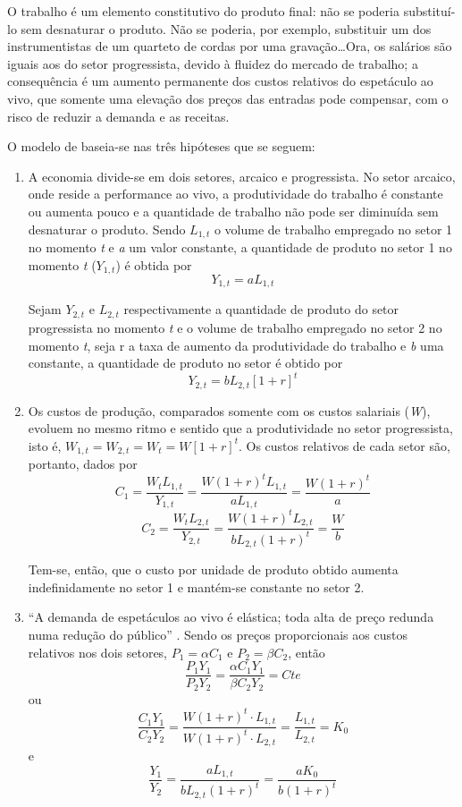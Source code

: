 \documentclass[a4paper, 12pt, openright, oneside, german, french, english, brazil, article]{abntex2}
\begin{document}
\begin{citacao}
	O trabalho é um elemento constitutivo do produto final: não se poderia substituí-lo sem desnaturar o produto. Não se poderia, por exemplo, substituir um dos instrumentistas de um quarteto de cordas por uma gravação\ldots Ora, os salários são iguais aos do setor progressista, devido à fluidez do mercado de trabalho; a consequência é um aumento permanente dos custos relativos do espetáculo ao vivo, que somente uma elevação dos preços das entradas pode compensar, com o risco de reduzir a demanda e as receitas. 
\end{citacao}

O modelo de  baseia-se nas três hipóteses que se seguem:

\begin{enumerate}
	\item A economia divide-se em dois setores, arcaico e progressista. No setor arcaico, onde reside a performance ao vivo, a produtividade do trabalho é constante ou aumenta pouco e a quantidade de trabalho não pode ser diminuída sem desnaturar o produto. Sendo $L_{1,t}$ o volume de trabalho empregado no setor 1 no momento \textit{t} e \textit{a} um valor constante, a quantidade de produto no setor 1 no momento \textit{t} ($Y_{1,t}$) é obtida por $$Y_{1,t} = aL_{1,t}$$
	
	Sejam $Y_{2,t}$ e $L_{2,t}$ respectivamente a quantidade de produto do setor progressista no momento \textit{t} e o volume de trabalho empregado no setor 2 no momento \textit{t}, seja r a taxa de aumento da produtividade do trabalho e \textit{b} uma constante, a quantidade de produto no setor é obtido por $$Y_{2,t} = bL_{2,t}[1+r]^t $$
	
	\item Os custos de produção, comparados somente com os custos salariais (\textit{W}), evoluem no mesmo ritmo e sentido que a produtividade no setor progressista, isto é, $W_{1,t} = W_{2,t} = W_t = W[1+r]^t$. Os custos relativos de cada setor são, portanto, dados por
	$$C_1 = \frac{W_tL_{1,t}}{Y_{1,t}} = \frac{W(1+r)^tL_{1,t}}{aL_{1,t}} = \frac{W(1+r)^t}{a}$$
	$$C_2 = \frac{W_tL_{2,t}}{Y_{2,t}} = \frac{W(1+r)^tL_{2,t}}{bL_{2,t}(1+r)^t} = \frac{W}{b}$$
	
	Tem-se, então, que o custo por unidade de produto obtido aumenta indefinidamente no setor 1 e mantém-se constante no setor 2.
	
	\item ``A demanda de espetáculos ao vivo é elástica; toda alta de preço redunda numa redução do público'' \cite[p. 56]{benhamou2007economia}. Sendo os preços proporcionais aos custos relativos nos dois setores, $P_1 = \alpha C_1$ e $P_2 = \beta C_2$, então
	$$\frac{P_1Y_1}{P_2Y_2} = \frac{\alpha C_1Y_1}{\beta C_2Y_2} = Cte$$ ou
	$$\frac{C_1Y_1}{C_2Y_2} = \frac{W(1+r)^t \cdot L_{1,t}}{W(1+r)^t \cdot L_{2,t}} = \frac{L_{1,t}}{L_{2,t}} = K_0$$ e
	$$\frac{Y_1}{Y_2} = \frac{aL_{1,t}}{bL_{2,t}(1+r)^t} = \frac{aK_0}{b(1+r)^t}$$
	

\end{enumerate}
\end{document}
